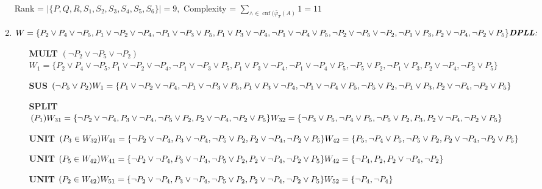 \documentclass[a4paper,12pt, centered]{article}
\DeclareMathOperator{\cnf}{cnf}
\begin{document}
\begin{enumerate}
\begin{align*}
		\end{align*}
		Rank = $\left|\{P,Q,R,S_1,S_2,S_3,S_4,S_5,S_6\}\right|=9,$ Complexity = $\displaystyle\sum_{\land\in\cnf(\tilde{\varphi_T}(A)}1=11$ 
	\item $W = \{P_2 \lor P_4 \lor  \neg P_5, P_1 \lor  \neg P_2 \lor  \neg P_4, \neg P_1 \lor  \neg P_3 \lor P_5, P_1 \lor P_3 \lor  \neg P_4, \neg P_1 \lor  \neg P_4 \lor P_5, \neg P_2 \lor  \neg P_5 \lor  \neg P_2,
\neg P_1 \lor  P_3, P_2 \lor  \neg P_4, \neg P_2 \lor P_5\} \\\\\emph{\textbf{DPLL}:}\\$
	\begin{itemize}
		\item [\textbf{MULT}] $(\neg P_2 \lor  \neg P_5 \lor  \neg P_2)$\\$W_1 = \{P_2 \lor P_4 \lor  \neg P_5, P_1 \lor  \neg P_2 \lor  \neg P_4, \neg P_1 \lor  \neg P_3 \lor P_5, P_1 \lor P_3 \lor  \neg P_4, \neg P_1 \lor  \neg P_4 \lor P_5,\neg P_5\lor P_2, \neg P_1 \lor  P_3, P_2 \lor  \neg P_4, \neg P_2 \lor P_5\} $
		\item [\textbf{SUS}] $(\neg P_5\lor P_2)\\W_1 = \{P_1 \lor  \neg P_2 \lor  \neg P_4, \neg P_1 \lor  \neg P_3 \lor P_5, P_1 \lor P_3 \lor  \neg P_4, \neg P_1 \lor  \neg P_4 \lor P_5,\neg P_5\lor P_2, \neg P_1 \lor  P_3, P_2 \lor  \neg P_4, \neg P_2 \lor P_5\} $
		\item [\textbf{SPLIT}] $(P_1)\\W_{31} = \{\neg P_2 \lor  \neg P_4, P_3 \lor  \neg P_4, \neg P_5\lor P_2, P_2 \lor  \neg P_4, \neg P_2 \lor P_5\}\\W_{32} = \{\neg P_3 \lor P_5, \neg P_4 \lor P_5,\neg P_5\lor P_2, P_3, P_2 \lor  \neg P_4, \neg P_2 \lor P_5\}$
		\item [\textbf{UNIT}] $(P_3\in W_{32})\\W_{41} = \{\neg P_2 \lor  \neg P_4, P_3 \lor  \neg P_4, \neg P_5\lor P_2, P_2 \lor  \neg P_4, \neg P_2 \lor P_5\}\\W_{42} = \{P_5, \neg P_4 \lor P_5,\neg P_5\lor P_2,  P_2 \lor  \neg P_4, \neg P_2 \lor P_5\}$
		\item [\textbf{UNIT}] $(P_5\in W_{42})\\W_{41} = \{\neg P_2 \lor  \neg P_4, P_3 \lor  \neg P_4, \neg P_5\lor P_2, P_2 \lor  \neg P_4, \neg P_2 \lor P_5\}\\W_{42} = \{ \neg P_4 , P_2,  P_2 \lor  \neg P_4, \neg P_2 \}$
		\item [\textbf{UNIT}] $(P_2\in W_{42})\\W_{51} = \{\neg P_2 \lor  \neg P_4, P_3 \lor  \neg P_4, \neg P_5\lor P_2, P_2 \lor  \neg P_4, \neg P_2 \lor P_5\}\\W_{52} = \{ \neg P_4 , \neg P_4\}$

\end{itemize}
\end{enumerate}
\end{document}
